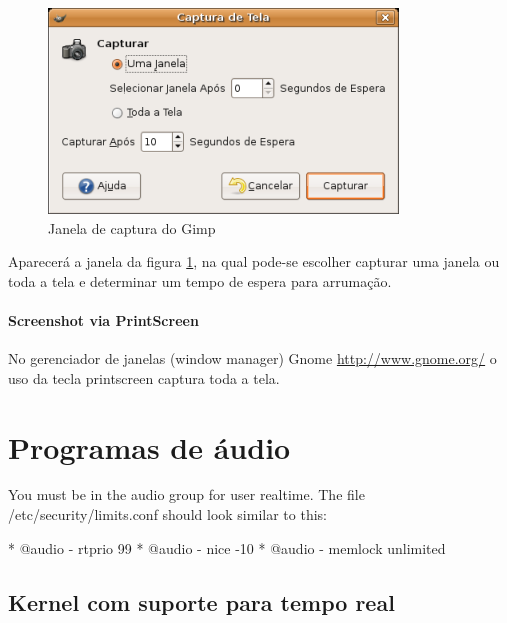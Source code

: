 \documentclass[12pt,brazil]{book}
\begin{document}
\begin{figure}[!h]
  \centering
    \includegraphics[scale=.7]{captura-gimp-screen}
    \caption{Janela de captura do Gimp}
    \label{fig:captura-gimp}
\end{figure}

Aparecerá a janela da figura \ref{fig:captura-gimp}, na qual pode-se
escolher capturar uma janela ou toda a tela e determinar um tempo de
espera para arrumação.

\subsection{Screenshot via PrintScreen}
\label{sec:scre-via-printscr}

No gerenciador de janelas (window manager) Gnome
\url{http://www.gnome.org/} o uso da tecla printscreen captura toda a
tela.

\part{Programas de áudio}
\label{part:programas-de-audio}


You must be in the audio group for user realtime. The file /etc/security/limits.conf should look similar to this:

    * @audio - rtprio 99
    * @audio - nice -10
    * @audio - memlock unlimited 


\chapter{Kernel com suporte para tempo real}
\label{cha:kernel-com-suporte}



\end{document}
